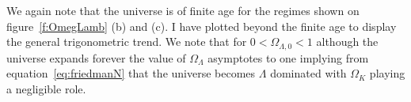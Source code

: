 \documentclass[twoside]{article}
\begin{document}
We again note that the universe is of finite age for the regimes shown on figure~\ref{f:OmegLamb} (b) and (c). I have plotted beyond the finite age to display the general trigonometric trend. We note that for  $0<\Omega_{\Lambda,0}<1$ although the universe expands forever the value of $\Omega_{\Lambda}$ asymptotes to one implying from equation~\ref{eq:friedmanN} that the universe becomes $\Lambda$ dominated with $\Omega_{K}$ playing a negligible role.
\end{document}
